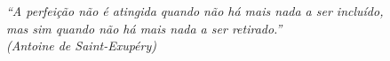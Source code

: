 
\vspace*{\fill}
	\begin{flushright}
		\textit{``A perfeição não é atingida quando não há mais nada a ser incluído,\\
			mas sim quando não há mais nada a ser retirado.''\\
			(Antoine de Saint-Exupéry)}
	\end{flushright}
